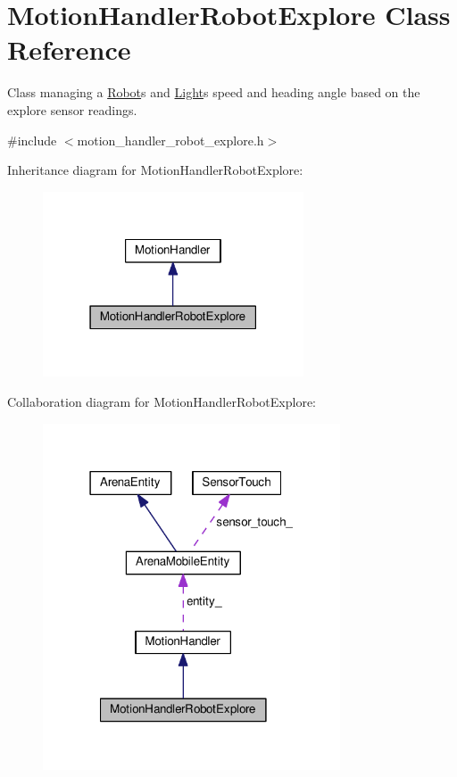 \hypertarget{classMotionHandlerRobotExplore}{}\section{Motion\+Handler\+Robot\+Explore Class Reference}
\label{classMotionHandlerRobotExplore}


Class managing a \hyperlink{classRobot}{Robot}\textquotesingle{}s and \hyperlink{classLight}{Light}\textquotesingle{}s speed and heading angle based on the explore sensor readings.  




{\ttfamily \#include $<$motion\+\_\+handler\+\_\+robot\+\_\+explore.\+h$>$}



Inheritance diagram for Motion\+Handler\+Robot\+Explore\+:\nopagebreak
\begin{figure}[H]
\begin{center}
\leavevmode
\includegraphics[width=219pt]{classMotionHandlerRobotExplore__inherit__graph}
\end{center}
\end{figure}


Collaboration diagram for Motion\+Handler\+Robot\+Explore\+:\nopagebreak
\begin{figure}[H]
\begin{center}
\leavevmode
\includegraphics[width=250pt]{classMotionHandlerRobotExplore__coll__graph}
\end{center}
\end{figure}
